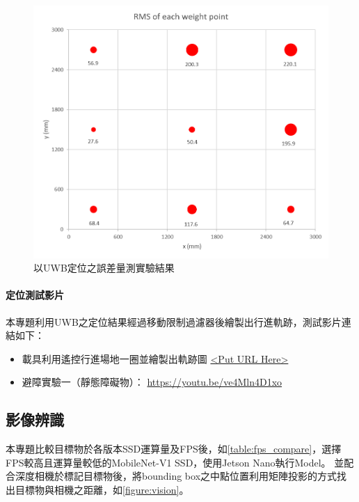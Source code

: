 \begin{figure}[bht]
	\centering
	\includegraphics[height=!,width=\linewidth,keepaspectratio=true]
	{images/uwb_bench.png}
	\caption{以UWB定位之誤差量測實驗結果}
	\label{figure:localization_result}
\end{figure}

\paragraph{定位測試影片} 

本專題利用UWB之定位結果經過移動限制過濾器後繪製出行進軌跡，測試影片連結如下：

\begin{itemize}

\item
載具利用遙控行進場地一圈並繪製出軌跡圖
\url{<Put URL Here>}

\item
避障實驗一（靜態障礙物）： 
\url{https://youtu.be/ve4Mln4D1xo}

\end{itemize}


\subsection{影像辨識}

本專題比較目標物於各版本SSD運算量及FPS後，如\ref{table:fps_compare}，選擇FPS較高且運算量較低的MobileNet-V1 SSD，使用Jetson Nano執行Model。
並配合深度相機於標記目標物後，將bounding box之中點位置利用矩陣投影的方式找出目標物與相機之距離，如\ref{figure:vision}。

